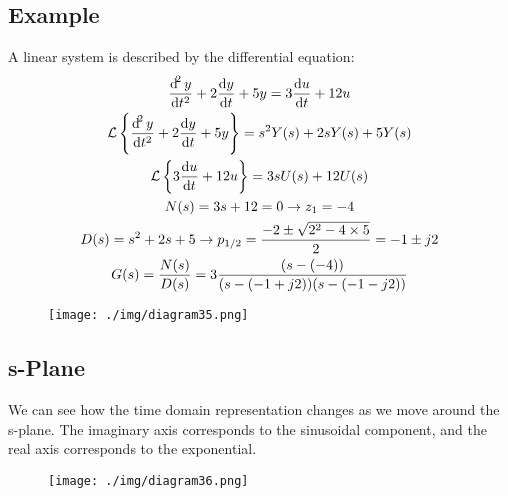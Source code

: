 \subsection{Example}
A linear system is described by the differential equation:
\begin{gather}
  \frac{\dif^2y}{\dif t^2} + 2\frac{\dif y}{\dif t} + 5y = 3\frac{\dif u}{\dif t} + 12u\\
  \mathcal{L} \left\{ \frac{\dif^2y}{\dif t^2} + 2\frac{\dif y}{\dif t} + 5y \right\} = s^2 Y(s) + 2sY(s) + 5Y(s)\\
  \mathcal{L} \left\{ 3\frac{\dif u}{\dif t} + 12u \right\} = 3sU(s) + 12U(s)\\
  N(s) = 3s + 12 = 0 \rightarrow z_1 = -4\\
  D(s) = s^2 + 2s + 5 \rightarrow p_{1/2} = \frac{-2 \pm \sqrt{2^2 - 4\times 5}}{2} = -1 \pm j2\\
  G(s) = \frac{N(s)}{D(s)} = 3 \frac{(s-(-4))}{(s-(-1+j2))(s-(-1-j2))}
\end{gather}
\begin{figure}[H]
  \centering
  \texttt{[image: ./img/diagram35.png]}
\end{figure}
\subsection{s-Plane}
We can see how the time domain representation changes as we move around the s-plane. The imaginary axis corresponds to the sinusoidal component, and the real axis corresponds to the exponential.
\begin{figure}[H]
  \centering
  \texttt{[image: ./img/diagram36.png]}
\end{figure}
